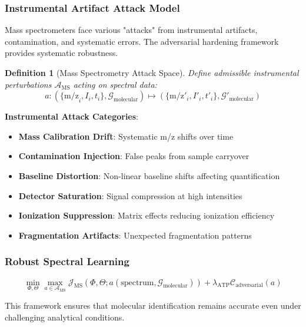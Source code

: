 \documentclass[11pt,a4paper]{article}
\newtheorem{definition}[theorem]{Definition}
\theoremstyle{remark}
\begin{document}
\subsubsection{Instrumental Artifact Attack Model}

Mass spectrometers face various "attacks" from instrumental artifacts, contamination, and systematic errors. The adversarial hardening framework provides systematic robustness.

\begin{definition}[Mass Spectrometry Attack Space]
Define admissible instrumental perturbations $\mathcal{A}_{\text{MS}}$ acting on spectral data:
\begin{equation}
a: (\{\text{m/z}_i, I_i, t_i\}, \mathcal{G}_{\text{molecular}}) \mapsto (\{\text{m/z}'_i, I'_i, t'_i\}, \mathcal{G}'_{\text{molecular}})
\end{equation}
\end{definition}

\textbf{Instrumental Attack Categories}:
\begin{itemize}
\item \textbf{Mass Calibration Drift}: Systematic m/z shifts over time
\item \textbf{Contamination Injection}: False peaks from sample carryover
\item \textbf{Baseline Distortion}: Non-linear baseline shifts affecting quantification
\item \textbf{Detector Saturation}: Signal compression at high intensities
\item \textbf{Ionization Suppression}: Matrix effects reducing ionization efficiency
\item \textbf{Fragmentation Artifacts}: Unexpected fragmentation patterns
\end{itemize}

\subsubsection{Robust Spectral Learning}

\begin{equation}
\min_{\Phi,\Theta} \max_{a \in \mathcal{A}_{\text{MS}}} \mathcal{J}_{\text{MS}}(\Phi,\Theta; a(\text{spectrum}, \mathcal{G}_{\text{molecular}})) + \lambda_{\text{ATP}} \mathcal{C}_{\text{adversarial}}(a)
\end{equation}

This framework ensures that molecular identification remains accurate even under challenging analytical conditions.
\end{document}
